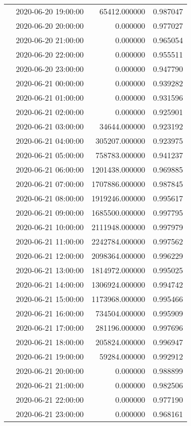\begin{tabular}{llrr}
 & 2020-06-20 19:00:00 & 65412.000000 & 0.987047 \\
 & 2020-06-20 20:00:00 & 0.000000 & 0.977027 \\
 & 2020-06-20 21:00:00 & 0.000000 & 0.965054 \\
 & 2020-06-20 22:00:00 & 0.000000 & 0.955511 \\
 & 2020-06-20 23:00:00 & 0.000000 & 0.947790 \\
 & 2020-06-21 00:00:00 & 0.000000 & 0.939282 \\
 & 2020-06-21 01:00:00 & 0.000000 & 0.931596 \\
 & 2020-06-21 02:00:00 & 0.000000 & 0.925901 \\
 & 2020-06-21 03:00:00 & 34644.000000 & 0.923192 \\
 & 2020-06-21 04:00:00 & 305207.000000 & 0.923975 \\
 & 2020-06-21 05:00:00 & 758783.000000 & 0.941237 \\
 & 2020-06-21 06:00:00 & 1201438.000000 & 0.969885 \\
 & 2020-06-21 07:00:00 & 1707886.000000 & 0.987845 \\
 & 2020-06-21 08:00:00 & 1919246.000000 & 0.995617 \\
 & 2020-06-21 09:00:00 & 1685500.000000 & 0.997795 \\
 & 2020-06-21 10:00:00 & 2111948.000000 & 0.997979 \\
 & 2020-06-21 11:00:00 & 2242784.000000 & 0.997562 \\
 & 2020-06-21 12:00:00 & 2098364.000000 & 0.996229 \\
 & 2020-06-21 13:00:00 & 1814972.000000 & 0.995025 \\
 & 2020-06-21 14:00:00 & 1306924.000000 & 0.994742 \\
 & 2020-06-21 15:00:00 & 1173968.000000 & 0.995466 \\
 & 2020-06-21 16:00:00 & 734504.000000 & 0.995909 \\
 & 2020-06-21 17:00:00 & 281196.000000 & 0.997696 \\
 & 2020-06-21 18:00:00 & 205824.000000 & 0.996947 \\
 & 2020-06-21 19:00:00 & 59284.000000 & 0.992912 \\
 & 2020-06-21 20:00:00 & 0.000000 & 0.988899 \\
 & 2020-06-21 21:00:00 & 0.000000 & 0.982506 \\
 & 2020-06-21 22:00:00 & 0.000000 & 0.977190 \\
 & 2020-06-21 23:00:00 & 0.000000 & 0.968161 \\

\end{tabular}
